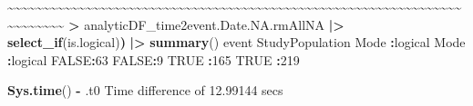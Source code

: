 \documentclass[
]{article}
\newenvironment{Shaded}{\begin{snugshade}}{\end{snugshade}}
\newcommand{\ConstantTok}[1]{\textcolor[rgb]{0.56,0.35,0.01}{#1}}
\newcommand{\DecValTok}[1]{\textcolor[rgb]{0.00,0.00,0.81}{#1}}
\newcommand{\ErrorTok}[1]{\textcolor[rgb]{0.64,0.00,0.00}{\textbf{#1}}}
\newcommand{\FloatTok}[1]{\textcolor[rgb]{0.00,0.00,0.81}{#1}}
\newcommand{\FunctionTok}[1]{\textcolor[rgb]{0.13,0.29,0.53}{\textbf{#1}}}
\newcommand{\NormalTok}[1]{#1}
\newcommand{\SpecialCharTok}[1]{\textcolor[rgb]{0.81,0.36,0.00}{\textbf{#1}}}
\begin{document}
\begin{Shaded}
\begin{Highlighting}[]
    \SpecialCharTok{\textasciitilde{}}\ErrorTok{\textasciitilde{}\textasciitilde{}\textasciitilde{}\textasciitilde{}\textasciitilde{}\textasciitilde{}\textasciitilde{}\textasciitilde{}\textasciitilde{}\textasciitilde{}\textasciitilde{}\textasciitilde{}\textasciitilde{}\textasciitilde{}\textasciitilde{}\textasciitilde{}\textasciitilde{}\textasciitilde{}\textasciitilde{}\textasciitilde{}\textasciitilde{}\textasciitilde{}\textasciitilde{}\textasciitilde{}\textasciitilde{}\textasciitilde{}\textasciitilde{}\textasciitilde{}\textasciitilde{}\textasciitilde{}\textasciitilde{}\textasciitilde{}\textasciitilde{}\textasciitilde{}\textasciitilde{}\textasciitilde{}\textasciitilde{}\textasciitilde{}\textasciitilde{}\textasciitilde{}\textasciitilde{}\textasciitilde{}\textasciitilde{}\textasciitilde{}\textasciitilde{}\textasciitilde{}\textasciitilde{}\textasciitilde{}\textasciitilde{}\textasciitilde{}\textasciitilde{}\textasciitilde{}\textasciitilde{}\textasciitilde{}\textasciitilde{}\textasciitilde{}\textasciitilde{}\textasciitilde{}\textasciitilde{}\textasciitilde{}\textasciitilde{}\textasciitilde{}\textasciitilde{}\textasciitilde{}\textasciitilde{}\textasciitilde{}\textasciitilde{}\textasciitilde{}\textasciitilde{}\textasciitilde{}\textasciitilde{}}    
 \ErrorTok{\textgreater{}}\NormalTok{ analyticDF\_time2event.Date.NA.rmAllNA }\SpecialCharTok{|\textgreater{}} \FunctionTok{select\_if}\NormalTok{(is.logical)}\ErrorTok{)} \SpecialCharTok{|\textgreater{}} \FunctionTok{summary}\NormalTok{()  }
\NormalTok{   event         StudyPopulation}
\NormalTok{ Mode }\SpecialCharTok{:}\NormalTok{logical   Mode }\SpecialCharTok{:}\NormalTok{logical  }
 \ConstantTok{FALSE}\SpecialCharTok{:}\DecValTok{63}        \ConstantTok{FALSE}\SpecialCharTok{:}\DecValTok{9}        
 \ConstantTok{TRUE} \SpecialCharTok{:}\DecValTok{165}       \ConstantTok{TRUE} \SpecialCharTok{:}\DecValTok{219}      
\end{Highlighting}
\end{Shaded}

\begin{Shaded}
\begin{Highlighting}[]
\FunctionTok{Sys.time}\NormalTok{() }\SpecialCharTok{{-}}\NormalTok{ .t0}
\NormalTok{Time difference of }\FloatTok{12.99144}\NormalTok{ secs}
\end{Highlighting}
\end{Shaded}
\end{document}
